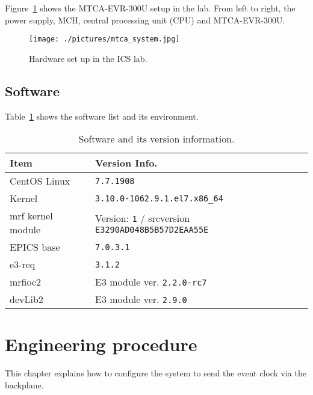 \documentclass[11pt
  , a4paper
  , article
  , oneside
  , showtrims
]{memoir}
\begin{document}
Figure~\ref{fig:mtca-system} shows the MTCA-EVR-300U setup in the lab. From left to right, the power supply, MCH,  central processing unit (CPU) and MTCA-EVR-300U.\\

\begin{figure}[!b]
  \centering
  \texttt{[image: ./pictures/mtca\_system.jpg]}
  \caption{Hardware set up in the ICS lab.}
  \label{fig:mtca-system}
\end{figure}


\section{Software}
Table~\ref{table:swlist} shows the software list and its environment.\\

\begin{table}[!htb]
  \centering
  \begin{tabular}{l|l}
    \toprule
    Item               & Version Info.                                                      \\\midrule
    CentOS Linux       & \texttt{7.7.1908}                                                  \\\midrule
    Kernel             & \texttt{3.10.0-1062.9.1.el7.x86\_64}                               \\\midrule
    mrf kernel module  & Version: \texttt{1} / srcversion \texttt{E3290AD048B5B57D2EAA55E}  \\\midrule
    EPICS base         & \texttt{7.0.3.1}                                                   \\\midrule
    e3-req             & \texttt{3.1.2}                                                     \\\midrule
    mrfioc2            & E3 module ver. \texttt{2.2.0-rc7}                                  \\\midrule
    devLib2            & E3 module ver. \texttt{2.9.0}                                      \\\bottomrule
  \end{tabular}
  \caption[]{Software and its version information.}
  \label{table:swlist}
\end{table}


\chapter{Engineering procedure}
This chapter explains how to configure the system to send the event clock via the backplane.\\
\end{document}
